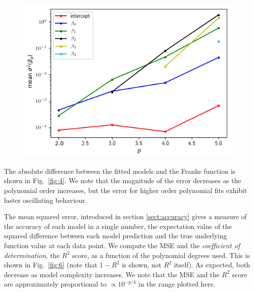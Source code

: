 \documentclass[a4paper, twocolumn]{article}
\newcommand{\fig}[1]{Fig.\ \ref{fig:#1}}
\begin{document}
\begin{figure}
\centering
\includegraphics[width=\linewidth]{beta_variance_OLS.png}
\end{figure}

The absolute difference between the fitted models and the Franke function is shown in \fig{4}. We note that the magnitude of the error decreases as the polynomial order increases, but the error for higher order polynomial fits exhibit faster oscillating behaviour. 

The mean squared error, introduced in section \ref{sect:accuracy} gives a measure of the accuracy of each model in a single number, the expectation value of the squared difference between each model prediction and the true underlying function value at each data point. We compute the MSE and the \textit{coefficient of determination}, the $R^2$ score, as a function of the polynomial degrees used. This is shown in \fig{6} (note that $1-R^2$ is shown, not $R^2$ itself). As expected, both decrease as model complexity increases. We note that the MSE and the $R^2$ score are approximately proportional to $\propto 10^{-p/4}$ in the range plotted here.
\end{document}
